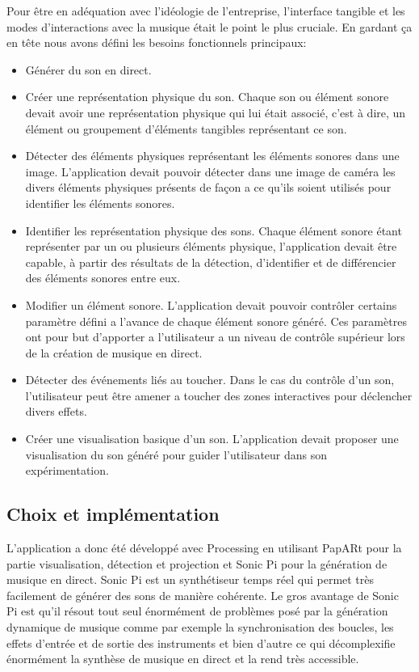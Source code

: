 Pour être en adéquation avec l'idéologie de l'entreprise, l'interface tangible et les modes d'interactions avec la musique était le point le plus cruciale. 
En gardant ça en tête nous avons défini les besoins fonctionnels principaux:
\begin{itemize}
\item Générer du son en direct.
\item Créer une représentation physique du son. Chaque son ou élément sonore devait avoir une représentation physique qui lui était associé, c'est à dire, un élément ou groupement d'éléments tangibles représentant ce son.
\item Détecter des éléments physiques représentant les éléments sonores dans une image. L'application devait pouvoir détecter dans une image de caméra les divers éléments physiques présents de façon a ce qu'ils soient utilisés pour identifier les éléments sonores.
\item Identifier les représentation physique des sons. Chaque élément sonore étant représenter par un ou plusieurs éléments physique, l'application devait être capable, à partir des résultats de la détection, d'identifier et de différencier des éléments sonores entre eux. 
\item Modifier un élément sonore. L'application devait pouvoir contrôler certains paramètre défini a l'avance de chaque élément sonore généré. Ces paramètres ont pour but d'apporter a l'utilisateur a un niveau de contrôle supérieur lors de la création de musique en direct.
\item Détecter des événements liés au toucher. Dans le cas du contrôle d'un son, l'utilisateur peut être amener a toucher des zones interactives pour déclencher divers effets.
\item Créer une visualisation basique d'un son. L'application devait proposer une visualisation du son généré pour guider l'utilisateur dans son expérimentation.
\end{itemize}

\subsection{Choix et implémentation}
\label{subsec:reartable:impl}
L'application a donc été développé avec Processing en utilisant PapARt pour la partie visualisation, détection et projection et Sonic Pi\cite{sonicpi} pour la génération de musique en direct.
Sonic Pi est un synthétiseur temps réel qui permet très facilement de générer des sons de manière cohérente. Le gros avantage de Sonic Pi est qu'il résout tout seul énormément de problèmes posé par la génération dynamique de musique comme par exemple la synchronisation des boucles, les effets d'entrée et de sortie des instruments et bien d'autre ce qui décomplexifie énormément la synthèse de musique en direct et la rend très accessible.

